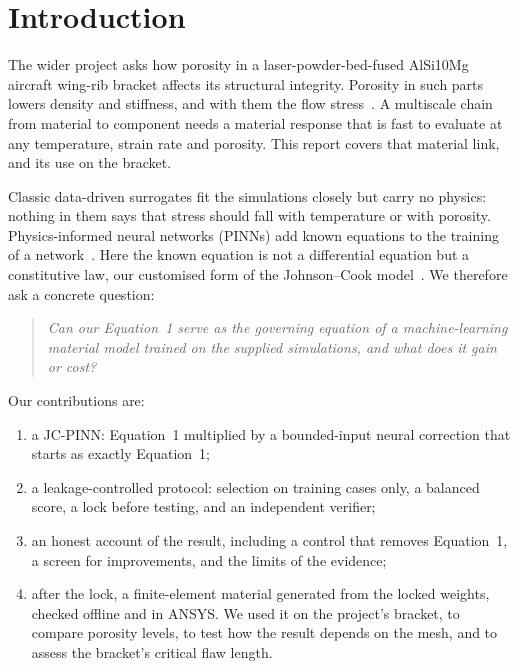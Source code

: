 \documentclass[11pt,a4paper]{article}
\begin{document}
\tableofcontents
\newpage

\section{Introduction}
The wider project asks how porosity in a laser-powder-bed-fused AlSi10Mg aircraft wing-rib bracket affects its structural integrity. Porosity in such parts lowers density and stiffness, and with them the flow stress~\cite{kempen2012}. A multiscale chain from material to component needs a material response that is fast to evaluate at any temperature, strain rate and porosity. This report covers that material link, and its use on the bracket.

Classic data-driven surrogates fit the simulations closely but carry no physics: nothing in them says that stress should fall with temperature or with porosity. Physics-informed neural networks (PINNs) add known equations to the training of a network~\cite{raissi2019,karniadakis2021,willard2022}. Here the known equation is not a differential equation but a constitutive law, our customised form of the Johnson--Cook model~\cite{johnson1983}. We therefore ask a concrete question:

\begin{quote}\itshape
Can our Equation~1 serve as the governing equation of a machine-learning material model trained on the supplied simulations, and what does it gain or cost?
\end{quote}

\noindent Our contributions are:
\begin{enumerate}
\item a JC-PINN: Equation~1 multiplied by a bounded-input neural correction that starts as exactly Equation~1;
\item a leakage-controlled protocol: selection on training cases only, a balanced score, a lock before testing, and an independent verifier;
\item an honest account of the result, including a control that removes Equation~1, a screen for improvements, and the limits of the evidence;
\item after the lock, a finite-element material generated from the locked weights, checked offline and in ANSYS. We used it on the project's bracket, to compare porosity levels, to test how the result depends on the mesh, and to assess the bracket's critical flaw length.
\end{enumerate}
\end{document}
